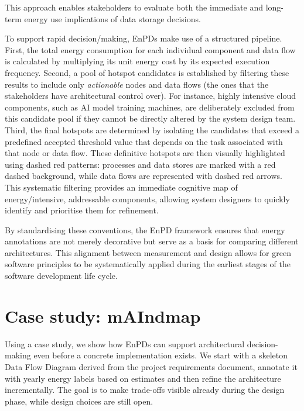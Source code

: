\documentclass[11pt,a4paper]{article}
\begin{document}
\begin{description}
  This approach enables stakeholders to evaluate both the immediate and long-term energy use implications of data storage decisions.
  \item[Hotspot identification] To support rapid decision\-/making, EnPDs make use of a structured pipeline.
  First, the total energy consumption for each individual component and data flow is calculated by multiplying its unit energy cost by its expected execution frequency.
  Second, a pool of hotspot candidates is established by filtering these results to include only \emph{actionable} nodes and data flows (the ones that the stakeholders have architectural control over).
  For instance, highly intensive cloud components, such as AI model training machines, are deliberately excluded from this candidate pool if they cannot be directly altered by the system design team.
  Third, the final hotspots are determined by isolating the candidates that exceed a predefined accepted threshold value that depends on the task associated with that node or data flow.
  These definitive hotspots are then visually highlighted using dashed red patterns: processes and data stores are marked with a red dashed background, while data flows are represented with dashed red arrows.
  This systematic filtering provides an immediate cognitive map of energy\-/intensive, addressable components, allowing system designers to quickly identify and prioritise them for refinement.
\end{description}
By standardising these conventions, the EnPD framework ensures that energy annotations are not merely decorative but serve as a basis for comparing different architectures.
This alignment between measurement and design allows for green software principles to be systematically applied during the earliest stages of the software development life cycle.

\section{Case study: mAIndmap}
Using a case study, we show how EnPDs can support architectural decision-making even before a concrete implementation exists.
We start with a skeleton Data Flow Diagram derived from the project requirements document, annotate it with yearly energy labels based on estimates and then refine the architecture incrementally.
The goal is to make trade-offs visible already during the design phase, while design choices are still open.
\end{document}
